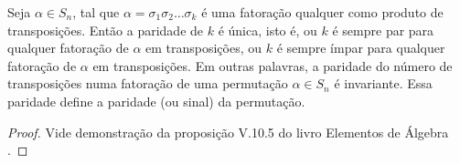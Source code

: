 \documentclass[11pt,openany]{book}
\begin{document}
\begin{proposition}
\label{prop:S_n_paridade_unica}
    Seja $\alpha \in S_n$, tal que $\alpha = \sigma_1 \sigma_2 \dots \sigma_k$ é uma fatoração qualquer como produto de transposições. Então a paridade de $k$ é única, isto é, ou $k$ é sempre par para qualquer fatoração de $\alpha$ em transposições, ou $k$ é sempre ímpar para qualquer fatoração de $\alpha$ em transposições.  Em outras palavras, a paridade do número de transposições numa fatoração de uma permutação $\alpha \in S_n$ é invariante. Essa paridade define a paridade (ou sinal) da permutação.
\end{proposition}
\begin{proof}
    Vide demonstração da proposição V.10.5 do livro Elementos de Álgebra \cite{GARCIA2013}.










\end{proof}
\end{document}
